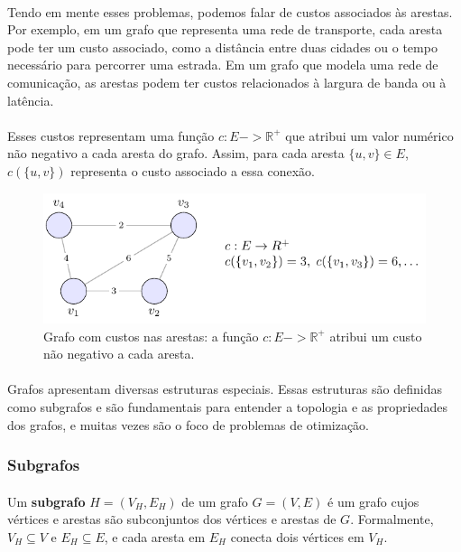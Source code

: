\documentclass[12pt,a4paper]{article}
\def\to{->}%
\begin{document}
\paragraph{}
Tendo em mente esses problemas, podemos falar de custos associados às arestas. Por exemplo, em um grafo que representa uma rede de transporte, cada aresta pode ter um custo associado, como a distância entre duas cidades ou o tempo necessário para percorrer uma estrada. Em um grafo que modela uma rede de comunicação, as arestas podem ter custos relacionados à largura de banda ou à latência.

\paragraph{}
Esses custos representam uma função \(c: E \to \mathbb{R}^+\) que atribui um valor numérico não negativo a cada aresta do grafo. Assim, para cada aresta \(\{u, v\} \in E\), \(c(\{u, v\})\) representa o custo associado a essa conexão.


\begin{figure}[H]
    \centering
    \includegraphics[width=0.9\linewidth]{figures/fig_grafo_custos.pdf}

    \caption{Grafo com custos nas arestas: a função $c:E\to\mathbb{R}^+$ atribui um custo não negativo a cada aresta.}
    \label{fig:grafo-custos}
    \end{figure}


\paragraph{}
Grafos apresentam diversas estruturas especiais. Essas estruturas são definidas como subgrafos e são fundamentais para entender a topologia e as propriedades dos grafos, e muitas vezes são o foco de problemas de otimização. 

\subsubsection{Subgrafos}
\paragraph{}Um \textbf{subgrafo} \(H = (V_H, E_H)\) de um grafo \(G = (V, E)\) é um grafo cujos vértices e arestas são subconjuntos dos vértices e arestas de \(G\). Formalmente, \(V_H \subseteq V\) e \(E_H \subseteq E\), e cada aresta em \(E_H\) conecta dois vértices em \(V_H\).
\end{document}
